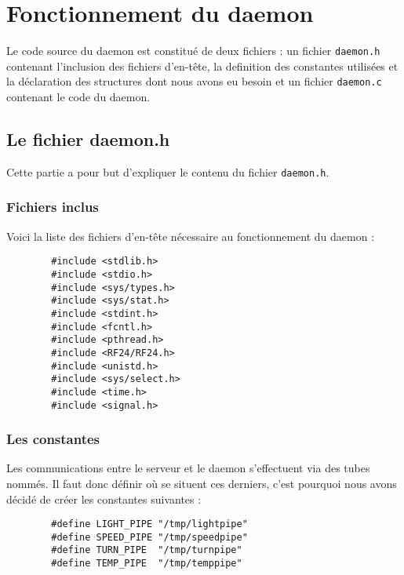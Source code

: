 \section{Fonctionnement du daemon}

Le code source du daemon est constitué de deux fichiers : un fichier 
\texttt{daemon.h} contenant l'inclusion des fichiers d'en-tête, la definition
des constantes utilisées et la déclaration des structures dont nous avons eu
besoin et un fichier \texttt{daemon.c} contenant le code du daemon.

\subsection{Le fichier daemon.h}

Cette partie a pour but d'expliquer le contenu du fichier \texttt{daemon.h}.

\pagebreak

\subsubsection{Fichiers inclus}

Voici la liste des fichiers d'en-tête nécessaire au fonctionnement du daemon : \\

\begin{DDbox}{\linewidth}
\begin{lstlisting}
        #include <stdlib.h>
        #include <stdio.h>   
        #include <sys/types.h>
        #include <sys/stat.h>
        #include <stdint.h>       
        #include <fcntl.h>
        #include <pthread.h>
        #include <RF24/RF24.h>
        #include <unistd.h>
        #include <sys/select.h>
        #include <time.h>
        #include <signal.h>
\end{lstlisting}
\end{DDbox}

\subsubsection{Les constantes}

Les communications entre le serveur et le daemon s'effectuent via des tubes
nommés. Il faut donc définir où se situent ces derniers, c'est pourquoi nous 
avons décidé de créer les constantes suivantes : \\

\begin{DDbox}{\linewidth}
\begin{lstlisting}
        #define LIGHT_PIPE "/tmp/lightpipe"
        #define SPEED_PIPE "/tmp/speedpipe"
        #define TURN_PIPE  "/tmp/turnpipe"
        #define TEMP_PIPE  "/tmp/temppipe"
\end{lstlisting}
\end{DDbox}

